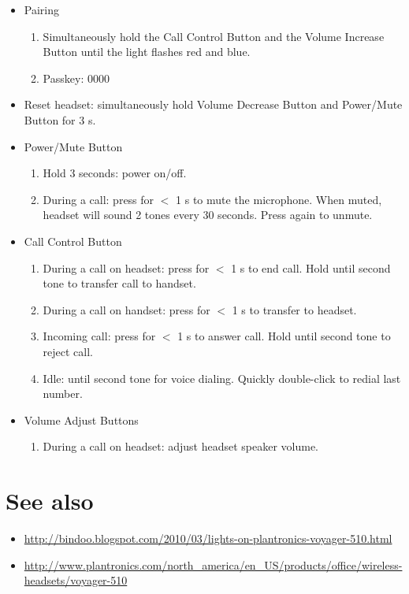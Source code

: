 \documentclass{article}
\begin{document}
\begin{itemize}
\item Pairing
  \begin{enumerate}
  \item Simultaneously hold the Call Control Button and the Volume
    Increase Button until the light flashes red and blue.
  \item Passkey: 0000
  \end{enumerate}
\item Reset headset: simultaneously hold Volume Decrease Button and
  Power/Mute Button for 3 s.
\item Power/Mute Button
  \begin{enumerate}
  \item Hold 3 seconds: power on/off.
  \item During a call: press for $<$ 1 s to mute the microphone. When
    muted, headset will sound 2 tones every 30 seconds. Press again to
    unmute.
  \end{enumerate}
\item Call Control Button
  \begin{enumerate}
  \item During a call on headset: press for $<$ 1 s to end call. Hold
    until second tone to transfer call to handset.
  \item During a call on handset: press for $<$ 1 s to transfer to
    headset.
  \item Incoming call: press for $<$ 1 s to answer call. Hold until
    second tone to reject call.
  \item Idle: until second tone for voice dialing. Quickly
    double-click to redial last number.
  \end{enumerate}
\item Volume Adjust Buttons
  \begin{enumerate}
  \item During a call on headset: adjust headset speaker volume.
  \end{enumerate}
\end{itemize}

\section{See also}
\label{sec:see-also}

\begin{itemize}
\item \url{http://bindoo.blogspot.com/2010/03/lights-on-plantronics-voyager-510.html}
\item \url{http://www.plantronics.com/north_america/en_US/products/office/wireless-headsets/voyager-510}
\end{itemize}
\end{document}
